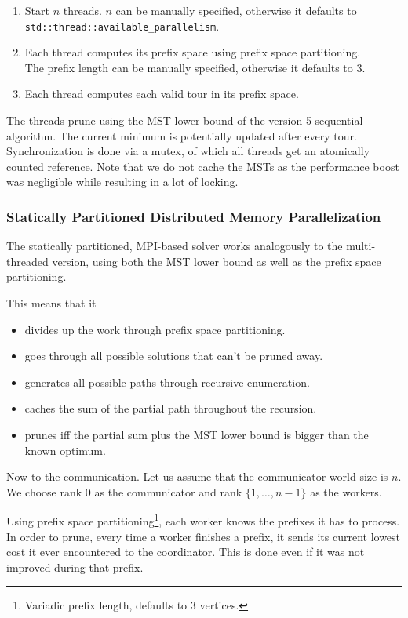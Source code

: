 \begin{enumerate}
\item Start $n$ threads. $n$ can be manually specified, otherwise it defaults to\\\texttt{std::thread::available\_parallelism}.
\item Each thread computes its prefix space using prefix space partitioning.\\
    The prefix length can be manually specified, otherwise it defaults to $3$.
\item Each thread computes each valid tour in its prefix space.
\end{enumerate}

The threads prune using the \ac{MST} lower bound of the version 5 sequential algorithm. The current minimum is potentially updated after every tour. Synchronization is done via a mutex, of which all threads get an atomically counted reference. Note that we do not cache the \acp{MST} as the performance boost was negligible while resulting in a lot of locking.

\subsubsection{Statically Partitioned Distributed Memory Parallelization}

The statically partitioned, \acs{MPI}-based solver works analogously to the multi-threaded version, using both the \acs{MST} lower bound as well as the prefix space partitioning.

This means that it
\begin{itemize}
\item divides up the work through prefix space partitioning.
\item goes through all possible solutions that can't be pruned away.
\item generates all possible paths through recursive enumeration.
\item caches the sum of the partial path throughout the recursion.
\item prunes iff the partial sum plus the \acs{MST} lower bound is bigger than the known optimum.
\end{itemize}

Now to the communication. Let us assume that the communicator world size is $n$. We choose rank $0$ as the communicator and rank $\{1,\dots,n-1\}$ as the workers.

Using prefix space partitioning\footnote{Variadic prefix length, defaults to $3$ vertices.}, each worker knows the prefixes it has to process. In order to prune, every time a worker finishes a prefix, it sends its current lowest cost it ever encountered to the coordinator. This is done even if it was not improved during that prefix.

